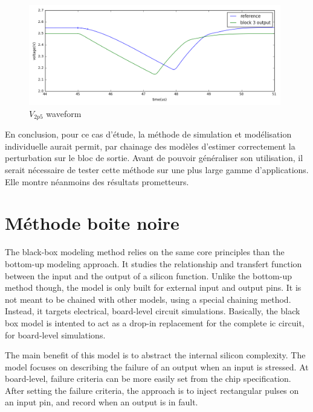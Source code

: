 \begin{figure}[!h]
  \centering
  \includegraphics[width=0.98\textwidth]{src/1/figures/simulation_comparison_block3.png}
  \caption{$V_{2p5}$ waveform}
  \label{fig:sim-compare-block3}
\end{figure}

En conclusion, pour ce cas d'étude, la méthode de simulation et modélisation individuelle aurait permit, par chainage des modèles d'estimer correctement la perturbation sur le bloc de sortie.
Avant de pouvoir généraliser son utilisation, il serait nécessaire de tester cette méthode sur une plus large gamme d'applications.
Elle montre néanmoins des résultats prometteurs.

\section{Méthode boite noire}

The black-box modeling method relies on the same core principles than the bottom-up modeling approach.
It studies the relationship and transfert function between the input and the output of a silicon function.
Unlike the bottom-up method though, the model is only built for external input and output pins.
It is not meant to be chained with other models, using a special chaining method.
Instead, it targets electrical, board-level circuit simulations.
Basically, the black box model is intented to act as a drop-in replacement for the complete \gls{ic} circuit, for board-level simulations.

The main benefit of this model is to abstract the internal silicon complexity.
The model focuses on describing the failure of an output when an input is stressed.
At board-level, failure criteria can be more easily set from the chip specification.
After setting the failure criteria, the approach is to inject rectangular pulses on an input pin, and record when an output is in fault.



